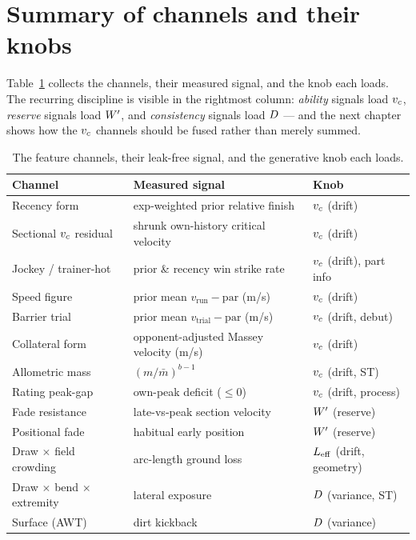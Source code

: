 \section{Summary of channels and their knobs}

Table~\ref{tab:channels} collects the channels, their measured signal, and the knob each loads.
The recurring discipline is visible in the rightmost column: \emph{ability} signals load ${v_{c}}$,
\emph{reserve} signals load ${W^{\prime}}$, and \emph{consistency} signals load $D$ --- and the next
chapter shows how the ${v_{c}}$ channels should be fused rather than merely summed.

\begin{table}[h]
\centering
\small
\begin{tabular}{@{}lll@{}}
\toprule
Channel & Measured signal & Knob \\
\midrule
Recency form & exp-weighted prior relative finish & ${v_{c}}$ (drift) \\
Sectional ${v_{c}}$ residual & shrunk own-history critical velocity & ${v_{c}}$ (drift) \\
Jockey / trainer-hot & prior \& recency win strike rate & ${v_{c}}$ (drift), part info \\
Speed figure & prior mean $v_{\text{run}}-\mathrm{par}$ (m/s) & ${v_{c}}$ (drift) \\
Barrier trial & prior mean $v_{\text{trial}}-\mathrm{par}$ (m/s) & ${v_{c}}$ (drift, debut) \\
Collateral form & opponent-adjusted Massey velocity (m/s) & ${v_{c}}$ (drift) \\
Allometric mass & $(m/\bar m)^{b-1}$ & ${v_{c}}$ (drift, ST) \\
Rating peak-gap & own-peak deficit ($\le 0$) & ${v_{c}}$ (drift, process) \\
Fade resistance & late-vs-peak section velocity & ${W^{\prime}}$ (reserve) \\
Positional fade & habitual early position & ${W^{\prime}}$ (reserve) \\
Draw $\times$ field crowding & arc-length ground loss & ${L_{\mathrm{eff}}}$ (drift, geometry) \\
Draw $\times$ bend $\times$ extremity & lateral exposure & $D$ (variance, ST) \\
Surface (AWT) & dirt kickback & $D$ (variance) \\
\bottomrule
\end{tabular}
\caption{The feature channels, their leak-free signal, and the generative knob each loads.}
\label{tab:channels}
\end{table}
